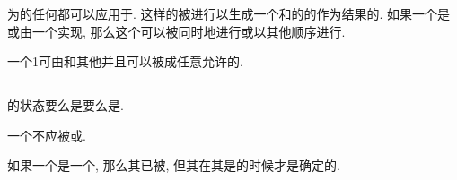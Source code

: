 为\Scalar{}\Object{}\Define{}的任何\Intrinsic{}\Operation{}都可以应用于\Conformable{}\Object{}. 这样的\Operation{}被\Elementally{}进行以生成一个和\Array{}的\Operand{}\Conformable{}的作为结果的\Array{}. 如果一个\Elemental{}\Operation{}是\Intrinsic{}\Prue{}\Operation{}或由一个\Prue{}\Elemental{}\Function{}实现, 那么这个\Elemental{}\Operation{}可以被同时地进行或以其他顺序进行.

一个1\Rank{}\Array{}可由\Scalar{}和其他\Array{}\Construct{}并且可以被\Reshape{}成任意允许的\Array{}\Shape{}.

\subsection{\Allocatable{}\Variable{}}

\Allocatable{}\Variable{}的\Allocation{}状态要么是\Allocated{}要么是\Unallocated{}.

一个\Unallocated{}\Variable{}不应被\Reference{}或\Define{}.

如果一个\Allocatable{}\Variable{}是一个\Array{}, 那么其\Rank{}已被\Declare{}, 但其\Bound{}在其是\Allocated{}的时候才是确定的.
